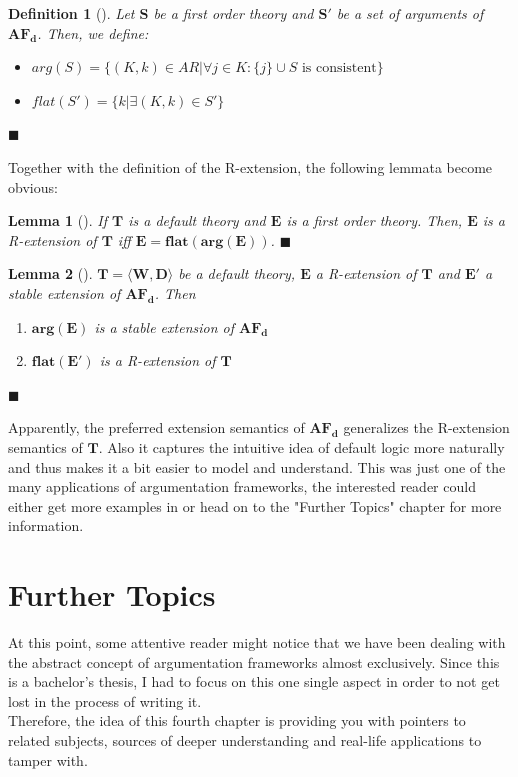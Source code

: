 \documentclass[12pt]{report}
\numberwithin{figure}{chapter}
\theoremstyle{break}
\newtheorem{defn}{Definition}[chapter]
\newtheorem{lem}{Lemma}[chapter]
\newenvironment{mydefn}{\begin{defn}}{$\blacksquare$ \end{defn}}
\newenvironment{mylem}{\begin{lem}}{$\blacksquare$ \end{lem}}
\begin{document}
\begin{mydefn}[\cite{Dung}]
Let $\bm{S}$ be a first order theory and $\bm{S'}$ be a set of arguments of $\bm{AF_{d}}$. Then, we define:\\
\begin{itemize}
	\item{$arg(S) = \{(K,k) \in AR \vert \forall j \in K: \{j\} \cup S \text{ is consistent}\}$}
	\item{$flat(S') = \{k \vert \exists(K,k) \in S'\}$}
\end{itemize}
\end{mydefn}

Together with the definition of the R-extension, the following lemmata become obvious:\\
\begin{mylem}[\cite{Dung}]
If $\bm{T}$ is a default theory and $\bm{E}$ is a first order theory. Then, $\bm{E}$ is a R-extension of $\bm{T}$ iff $\bm{E = flat(arg(E))}$.
\end{mylem}

\begin{mylem}[\cite{Dung}]
$\bm{T = \langle W,D \rangle}$ be a default theory, $\bm{E}$ a R-extension of $\bm{T}$ and $\bm{E'}$ a stable extension of $\bm{AF_{d}}$.
Then \\
\begin{enumerate}
	\item{$\bm{arg(E)}$ is a stable extension of $\bm{AF_{d}}$}
	\item{$\bm{flat(E')}$ is a R-extension of $\bm{T}$}
\end{enumerate}
\end{mylem}

Apparently, the preferred extension semantics of $\bm{AF_{d}}$ generalizes the R-extension semantics of $\bm{T}$.
Also it captures the intuitive idea of default logic more naturally and thus makes it a bit easier to model and understand.
This was just one of the many applications of argumentation frameworks, the interested reader could either get more examples in \cite{Dung} or
head on to the "Further Topics" chapter for more information.

\chapter{Further Topics}
At this point, some attentive reader might notice that we have been dealing with the abstract concept of argumentation frameworks almost exclusively.
Since this is a bachelor's thesis, I had to focus on this one single aspect in order to not get lost in the process of writing it.\\
Therefore, the idea of this fourth chapter is providing you with pointers to related subjects, sources of deeper understanding and real-life applications to tamper with.
\end{document}
